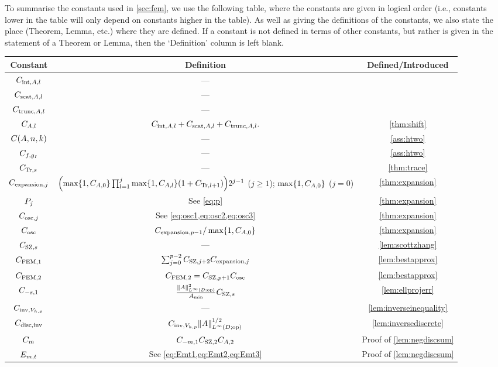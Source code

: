 To summarise the constants used in \cref{sec:fem}, we use the following table, where the constants are given in logical order (i.e., constants lower in the table will only depend on constants higher in the table). As well as giving the definitions of the constants, we also state the place (Theorem, Lemma, etc.) where they are defined. If a constant is not defined in terms of other constants, but rather is given in the statement of a Theorem or Lemma, then the `Definition' column is left blank.

\begin{longtabu}{ccc}
  \toprule
  Constant & Definition & Defined/Introduced\\
  \midrule
  \endhead
  $C_{\mathrm{int},A,l}$ & ---& \cite[Theorem 4.16]{Mc:00}\\
  $C_{\mathrm{scat},A,l}$ & ---& \cite[Theorem 4.18(i)]{Mc:00}\\
    $C_{\mathrm{trunc},A,l}$ & ---& \cite[Theorem 4.18(ii)]{Mc:00}\\
  $C_{A,l}$ & $C_{\mathrm{int},A,l} + C_{\mathrm{scat},A,l} + C_{\mathrm{trunc},A,l}.$ & \cref{thm:shift}\\
  $\CAnk$ &---& \cref{ass:htwo}\\
  $C_{f,g_{I}}$ &---& \cref{ass:htwo}\\
  $C_{\mathrm{Tr},s}$ &---& \cref{thm:trace}\\
  $C_{\mathrm{expansion},j}$ & $\mleft(\max\set{1,\CAz} \prod_{l=1}^j \max\set{1,\CAfn{l}} \mleft(1+\CTrfn{l+1}\mright)\mright)2^{j-1}$ ($j \geq 1$); $\max\set{1,\CAz}$ ($j=0$)& \cref{thm:expansion}\\
  $P_{j}$ & See \cref{eq:p}& \cref{thm:expansion}\\
  $C_{\mathrm{osc},j}$ & See \cref{eq:osc1,eq:osc2,eq:osc3} & \cref{thm:expansion}\\
  $C_{\mathrm{osc}}$ & $\Cefn{p-1}/\max\set{1,\CAz}$ & \cref{thm:expansion}\\
  $C_{\mathrm{SZ},s}$ &---& \cref{lem:scottzhang}\\
  $C_{\mathrm{FEM},1}$ & $\sum_{j=0}^{p-2}C_{\mathrm{SZ},j+2}C_{\mathrm{expansion},j} $ & \cref{lem:bestapprox}\\
  $C_{\mathrm{FEM},2}$ & $C_{\mathrm{FEM},2} = C_{\mathrm{SZ},p+1}C_{\mathrm{osc}}$ & \cref{lem:bestapprox}\\
  $C_{-s,1}$ &$\frac{\NLiDop{A}^2}{\Amin}\CSZs$& \cref{lem:ellprojerr} \\
  $C_{\mathrm{inv},V_{h,p}}$ &---& \cref{lem:inverseinequality}\\
  $C_{\mathrm{disc},\mathrm{inv}}$ & $\CinvVhp \NLiDop{A}^{1/2}$ & \cref{lem:inversediscrete}\\
  $C_{m}$ & $C_{-m,1} C_{\mathrm{SZ},2} C_{A,2}$ & Proof of \cref{lem:negdiscsum}\\
  $E_{m,t}$ & See \cref{eq:Emt1,eq:Emt2,eq:Emt3} & Proof of \cref{lem:negdiscsum}\\

\end{longtabu}
